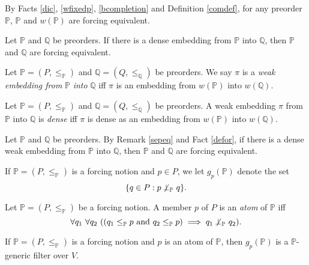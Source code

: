 \documentclass[12pt]{article}
\numberwithin{equation}{section}
\begin{document}
\begin{rem}\label{sepeq}
By Facts \ref{dic}, \ref{wfixedp}, \ref{bcompletion} and Definition \ref{comdef}, for any preorder $\mathbb{P}$, $\mathbb{P}$ and $w(\mathbb{P})$ are forcing equivalent.
\end{rem}

\begin{fact}\label{defor}
Let $\mathbb{P}$ and $\mathbb{Q}$ be preorders. If there is a dense embedding from $\mathbb{P}$ into $\mathbb{Q}$, then $\mathbb{P}$ and $\mathbb{Q}$ are forcing equivalent.
\end{fact}

\begin{defi}
Let $\mathbb{P} = (P, \leq_{\mathbb{P}})$ and $\mathbb{Q} = (Q, \leq_{\mathbb{Q}})$ be preorders. We say $\pi$ is a \emph{weak embedding from} $\mathbb{P}$ \emph{into} $\mathbb{Q}$ iff $\pi$ is an embedding from $w(\mathbb{P})$ into $w(\mathbb{Q})$.
\end{defi}

\begin{defi}
Let $\mathbb{P} = (P, \leq_{\mathbb{P}})$ and $\mathbb{Q} = (Q, \leq_{\mathbb{Q}})$ be preorders. A weak embedding $\pi$ from $\mathbb{P}$ into $\mathbb{Q}$ is \emph{dense} iff $\pi$ is dense as an embedding from $w(\mathbb{P})$ into $w(\mathbb{Q})$.
\end{defi}

\begin{rem}\label{dwefor}
Let $\mathbb{P}$ and $\mathbb{Q}$ be preorders. By Remark \ref{sepeq} and Fact \ref{defor}, if there is a dense weak embedding from $\mathbb{P}$ into $\mathbb{Q}$, then $\mathbb{P}$ and $\mathbb{Q}$ are forcing equivalent.
\end{rem}

\begin{defi}
If $\mathbb{P} = (P, \leq_{\mathbb{P}})$ is a forcing notion and $p \in P$, we let $g_p (\mathbb{P})$ denote the set $$\{q \in P : p \not \! \! \bot_{\mathbb{P}} \ q\}.$$
\end{defi}

\begin{defi}
Let $\mathbb{P} = (P, \leq_{\mathbb{P}})$ be a forcing notion. A member $p$ of $P$ is an \emph{atom} of $\mathbb{P}$ iff $$\forall q_1 \ \forall q_2 \ ((q_1 \leq_{\mathbb{P}} p \text{ and } q_2 \leq_{\mathbb{P}} p) \implies q_1 \not \! \! \bot_{\mathbb{P}} \ q_2).$$
\end{defi}

\begin{lem}\label{gpgeneric}
If $\mathbb{P} = (P, \leq_{\mathbb{P}})$ is a forcing notion and $p$ is an atom of $\mathbb{P}$, then $g_p (\mathbb{P})$ is a $\mathbb{P}$-generic filter over $V$.
\end{lem}
\end{document}

